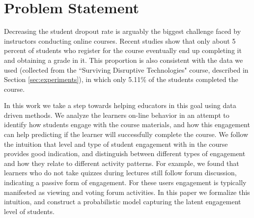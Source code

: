 \section{Problem Statement}
\label{sec:problem}

Decreasing the student dropout rate is arguably the biggest challenge faced by instructors conducting online courses. Recent studies \cite{kuh}  show that only about 5 percent of students who register for the course eventually end up completing it and obtaining a grade in it. This proportion is also consistent with the data we used (collected from the ``Surviving Disruptive Technologies" course, described in Section \ref{sec:experiments}), in which only 5.11\% of the students completed the course.
 
In this work we take a step towards helping educators in this goal using data driven methods. We analyze the learners on-line behavior in an attempt to identify how students engage with the course materials, and how this engagement can help predicting if the learner will successfully complete the course. We follow the intuition that level and type of student engagement with in the course provides good indication, and distinguish between different types of engagement and how they relate to different activity patterns. For example, we found that learners who do not take quizzes during lectures still follow forum discussion, indicating a passive form of engagement. For these users engagement is typically manifested as viewing and voting forum activities. 
In this paper we formalize this intuition, and construct a probabilistic model capturing the latent engagement level of students.

%
%
%
%

